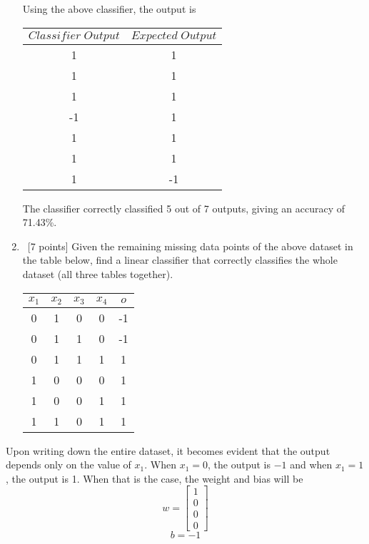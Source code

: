 \begin{enumerate}
Using the above classifier, the output is 
  \begin{center}
    \begin{tabular}{c|c}
      $Classifier \; Output$ & $Expected \; Output$ \\ \hline
      1 & 1 \\
      1 &  1 \\
       1 & 1 \\
       -1 & 1 \\
       1 & 1 \\
       1 &1 \\
      1 &-1 \\
    \end{tabular}
  \end{center}
  
  The classifier correctly classified 5 out of 7 outputs, giving an accuracy of 71.43\%.

\item ~[7 points] Given the remaining missing data points of the above dataset in the table below, find a linear classifier that correctly classifies the whole dataset (all three tables together). 
  \begin{center}
    \begin{tabular}{cccc|c}
      $x_1$ & $x_2$ & $x_3$ & $x_4$ & $o$ \\ \hline
      0 & 1 & 0 & 0 & -1\\
      0 & 1 & 1 & 0 & -1 \\
      0 & 1 & 1 & 1 & 1 \\
      1 & 0 & 0 & 0 & 1 \\
      1 & 0 & 0 & 1 & 1 \\
      1 & 1 & 0 & 1 & 1 \\
    \end{tabular}
  \end{center}
\end{enumerate}

Upon writing down the entire dataset, it becomes evident that the output depends only on the value of $x_1$. When $x_1 = 0$, the output is $-1$ and when $x_1=1$, the output is 1. When that is the case, the weight and bias will be
  \begin{equation*}
     w=\begin{bmatrix}
         1\\
         0 \\
         0\\
         0
        \end{bmatrix}
  \end{equation*}
  $$
  b=-1
  $$



